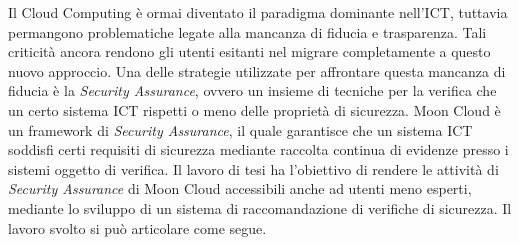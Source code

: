 \documentclass[10pt,a4paper]{article}
\begin{document}
\hfill\break
Il Cloud Computing è ormai diventato il paradigma dominante nell'ICT, tuttavia permangono problematiche legate alla mancanza di fiducia e trasparenza.
Tali criticità ancora rendono gli utenti esitanti nel migrare completamente a questo nuovo approccio.
Una delle strategie utilizzate per affrontare questa mancanza di fiducia è la \textit{Security Assurance}, ovvero un insieme di tecniche
per la verifica che un certo sistema ICT rispetti o meno delle proprietà di sicurezza.\hfill\break 
%
Moon Cloud è un framework di \textit{Security Assurance}, il quale garantisce che un sistema ICT soddisfi certi requisiti di sicurezza mediante 
raccolta continua di evidenze presso i sistemi oggetto di verifica.
%
Il lavoro di tesi ha l'obiettivo di rendere le attività di \textit{Security Assurance} di Moon Cloud accessibili anche ad utenti meno esperti,
mediante lo sviluppo di un sistema di raccomandazione di verifiche di sicurezza. Il lavoro svolto si può articolare come segue.
\end{document}
